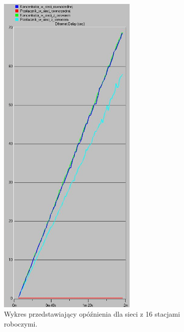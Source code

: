 \documentclass{article}
\begin{document}
\begin{figure}[H]
  \centering
  \includegraphics[width=0.60\textwidth]{screens/16_delay.png}
 \caption{Wykres przedstawiający opóźnienia dla sieci z 16 stacjami roboczymi.}
 \label{fig:16stacjed}
\end{figure}
\end{document}
